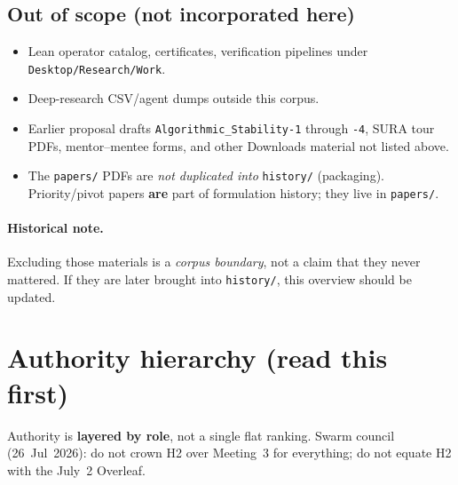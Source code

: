 \documentclass[11pt]{article}
\begin{document}
\subsection{Out of scope (not incorporated here)}
\begin{itemize}[leftmargin=*]
  \item Lean operator catalog, certificates, verification pipelines under
        \texttt{Desktop/Research/Work}.
  \item Deep-research CSV/agent dumps outside this corpus.
  \item Earlier proposal drafts \texttt{Algorithmic\_Stability-1} through \texttt{-4}, SURA tour
        PDFs, mentor--mentee forms, and other Downloads material not listed above.
  \item The \texttt{papers/} PDFs are \emph{not duplicated into} \texttt{history/}
        (packaging). Priority/pivot papers \textbf{are} part of formulation history;
        they live in \texttt{papers/}.
\end{itemize}

\paragraph{Historical note.}
Excluding those materials is a \emph{corpus boundary}, not a claim that they never mattered.
If they are later brought into \texttt{history/}, this overview should be updated.

\section{Authority hierarchy (read this first)}
Authority is \textbf{layered by role}, not a single flat ranking. Swarm council
(26~Jul~2026): do not crown H2 over Meeting~3 for everything; do not equate H2 with the
July~2 Overleaf.
\end{document}
